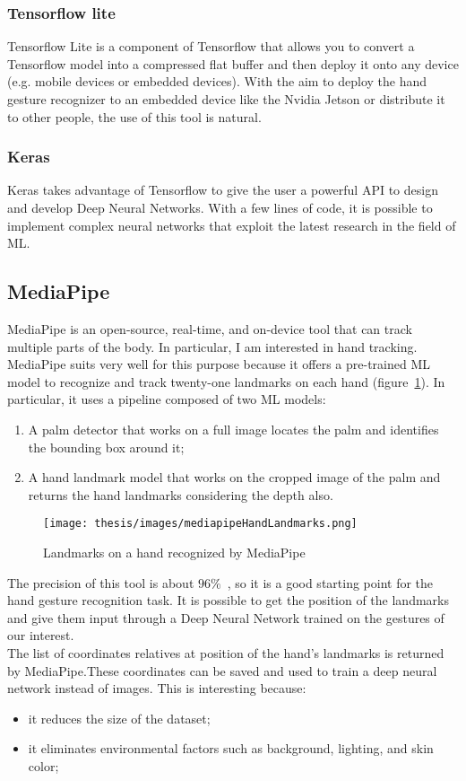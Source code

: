 \documentclass[../thesis.tex]{subfiles}
\begin{document}
\subsubsection{Tensorflow lite}
Tensorflow Lite is a component of Tensorflow that allows you to convert a Tensorflow model into a compressed flat buffer and then deploy it onto any device (e.g. mobile devices or embedded devices). With the aim to deploy the hand gesture recognizer to an embedded device like the Nvidia Jetson or distribute it to other people, the use of this tool is natural.

\subsubsection{Keras}
Keras takes advantage of Tensorflow to give the user a powerful API to design and develop Deep Neural Networks. With a few lines of code, it is possible to implement complex neural networks that exploit the latest research in the field of  \gls{ML}.

\subsection{MediaPipe}\label{sec:mediapipe}
MediaPipe is an open-source, real-time, and on-device tool that can track multiple parts of the body. In particular, I am interested in hand tracking. MediaPipe suits very well for this purpose because it offers a pre-trained \acrshort{ML} model to recognize and track twenty-one landmarks on each hand (figure~\ref{fig:landmarksMediapipe}). In particular, it uses a pipeline composed of two \acrshort{ML} models:
\begin{enumerate}
    \item A palm detector that works on a full image locates the palm and identifies the bounding box around it;
    \item A hand landmark model that works on the cropped image of the palm and returns the hand landmarks considering the depth also. 
\end{enumerate}
\begin{figure}[H]
    \centering
    \texttt{[image: thesis/images/mediapipeHandLandmarks.png]}
    \caption{Landmarks on a hand recognized by MediaPipe~\cite{site:mediapipe}}
    \label{fig:landmarksMediapipe}
\end{figure}
The precision of this tool is about $96\%$~\cite{paper:mediapipe}, so it is a good starting point for the hand gesture recognition task. It is possible to get the position of the landmarks and give them input through a Deep Neural Network trained on the gestures of our interest. \\
The list of coordinates relatives at position of the hand's landmarks is returned by MediaPipe.These coordinates can be saved and used to train a deep neural network instead of images. This is interesting because: 
\begin{itemize}
    \item it reduces the size of the dataset;
    \item it eliminates environmental factors such as background, lighting, and skin color;
\end{itemize}
\end{document}
